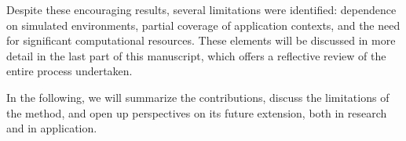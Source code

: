 Despite these encouraging results, several limitations were identified: dependence on simulated environments, partial coverage of application contexts, and the need for significant computational resources. These elements will be discussed in more detail in the last part of this manuscript, which offers a reflective review of the entire process undertaken.

\vspace{1em}

\noindent
In the following, we will summarize the contributions, discuss the limitations of the method, and open up perspectives on its future extension, both in research and in application.
